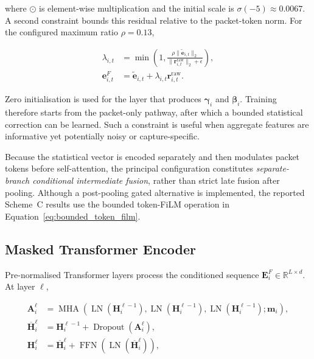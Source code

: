 \documentclass[11pt,fleqn]{report}
\begin{document}
where $\odot$ is element-wise multiplication and the initial scale is $\sigma(-5)\approx0.0067$. A second constraint bounds this residual relative to the packet-token norm. For the configured maximum ratio $\rho=0.13$,

\begin{align}
    \lambda_{i,t}
    &=\min\left(
        1,
        \frac{\rho\|\widetilde{\mathbf{e}}_{i,t}\|_2}
             {\|\mathbf{r}^{\mathrm{raw}}_{i,t}\|_2+\epsilon}
      \right),\\
    \mathbf{e}^{F}_{i,t}
    &=\widetilde{\mathbf{e}}_{i,t}
      +\lambda_{i,t}\mathbf{r}^{\mathrm{raw}}_{i,t}.
    \label{eq:bounded_token_film}
\end{align}

Zero initialisation is used for the layer that produces $\boldsymbol{\gamma}_i$ and $\boldsymbol{\beta}_i$. Training therefore starts from the packet-only pathway, after which a bounded statistical correction can be learned. Such a constraint is useful when aggregate features are informative yet potentially noisy or capture-specific.

Because the statistical vector is encoded separately and then modulates packet tokens before self-attention, the principal configuration constitutes \emph{separate-branch conditional intermediate fusion}, rather than strict late fusion after pooling. Although a post-pooling gated alternative is implemented, the reported Scheme~C results use the bounded token-FiLM operation in Equation~\ref{eq:bounded_token_film}.

\subsection{Masked Transformer Encoder}
\label{subsubsec:stage1_transformer}

Pre-normalised Transformer layers process the conditioned sequence $\mathbf{E}^{F}_i\in\mathbb{R}^{L\times d}$. At layer $\ell$,

\begin{align}
    \mathbf{A}^{\ell}_i
    &=\operatorname{MHA}
      \left(
        \operatorname{LN}(\mathbf{H}^{\ell-1}_i),
        \operatorname{LN}(\mathbf{H}^{\ell-1}_i),
        \operatorname{LN}(\mathbf{H}^{\ell-1}_i);
        \mathbf{m}_i
      \right),\\
    \overline{\mathbf{H}}^{\ell}_i
    &=\mathbf{H}^{\ell-1}_i
      +\operatorname{Dropout}(\mathbf{A}^{\ell}_i),\\
    \mathbf{H}^{\ell}_i
    &=\overline{\mathbf{H}}^{\ell}_i
      +\operatorname{FFN}
       \left(\operatorname{LN}(\overline{\mathbf{H}}^{\ell}_i)\right),
    \label{eq:stage1_transformer_layer}
\end{align}
\end{document}
